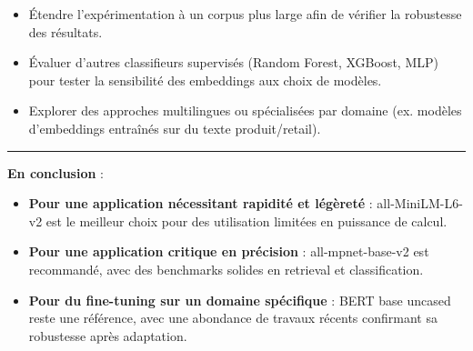 \documentclass[
  french,
  letterpaper,
  DIV=11,
  numbers=noendperiod]{scrartcl}
\providecommand{\tightlist}{%
  \setlength{\itemsep}{0pt}\setlength{\parskip}{0pt}}
\begin{document}
\begin{itemize}
\tightlist
\item
  Étendre l'expérimentation à un corpus plus large afin de vérifier la
  robustesse des résultats.
\item
  Évaluer d'autres classifieurs supervisés (Random Forest, XGBoost, MLP)
  pour tester la sensibilité des embeddings aux choix de modèles.
\item
  Explorer des approches multilingues ou spécialisées par domaine (ex.
  modèles d'embeddings entraînés sur du texte produit/retail).
\end{itemize}

\begin{center}\rule{0.5\linewidth}{0.5pt}\end{center}

\textbf{En conclusion} :

\begin{itemize}
\item
  \textbf{Pour une application nécessitant rapidité et légèreté} :
  all-MiniLM-L6-v2 est le meilleur choix pour des utilisation limitées
  en puissance de calcul.
\item
  \textbf{Pour une application critique en précision} :
  all-mpnet-base-v2 est recommandé, avec des benchmarks solides en
  retrieval et classification.
\item
  \textbf{Pour du fine-tuning sur un domaine spécifique} : BERT base
  uncased reste une référence, avec une abondance de travaux récents
  confirmant sa robustesse après adaptation.
\end{itemize}


\printbibliography[title=References]
\end{document}
